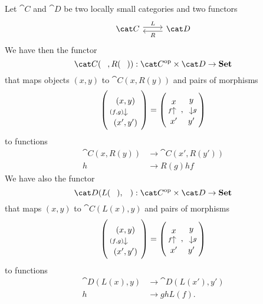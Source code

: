 \begin{construction}
Let \(\cat C\) and \(\cat D\) be two locally small categories and two functors
\[\begin{tikzcd} \cat C \ar["L", r, shift left] & \cat D \ar["R", l, shift left] \end{tikzcd}\]
We have then the functor
\[\cat C(\hole, R(\hole)) : \opcat C \times \cat D \to \Set\]
that maps objects \((x, y)\) to \(\cat C(x, R(y))\) and pairs of morphisms
\[\left(\begin{tikzcd}[row sep=small](x, y) \ar["{(f, g)}", d, swap] \\ (x', y')\end{tikzcd}\right) = \left(\begin{tikzcd}[row sep=small]x \\ x' \ar["f", u]\end{tikzcd}, \begin{tikzcd}[row sep=small]y \ar["g", d] \\ y'\end{tikzcd}\right)\]
to functions
\[\begin{aligned}
\cat C(x, R(y)) &\to \cat C(x', R(y')) \\
h &\to R(g) h f
\end{aligned}\]
We have also the functor
\[\cat D(L(\hole), \hole) : \opcat C \times \cat D \to \Set\]
that maps \((x, y)\) to \(\cat C(L(x), y)\) and pairs of morphisms
\[\left(\begin{tikzcd}[row sep=small](x, y) \ar["{(f, g)}", d, swap] \\ (x', y')\end{tikzcd}\right) = \left(\begin{tikzcd}[row sep=small]x \\ x' \ar["f", u]\end{tikzcd}, \begin{tikzcd}[row sep=small]y \ar["g", d] \\ y'\end{tikzcd}\right)\]
to functions
\[\begin{aligned}
\cat D(L(x), y) &\to \cat D(L(x'), y') \\
h &\to g h L(f) .
\end{aligned}\]
\end{construction}

